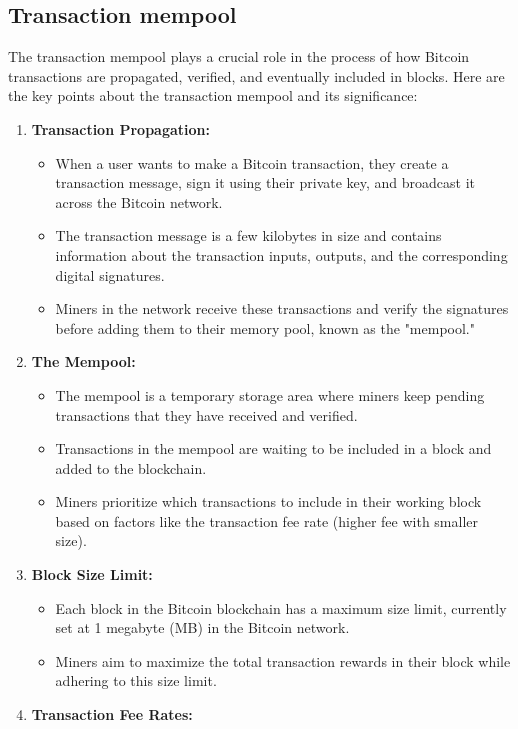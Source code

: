 \subsection{Transaction mempool}
The transaction mempool plays a crucial role in the process of how Bitcoin transactions are propagated, verified, and eventually included in blocks. Here are the key points about the transaction mempool and its significance:
\begin{enumerate}
	\item \textbf{Transaction Propagation:}
	\begin{itemize}
		\item When a user wants to make a Bitcoin transaction, they create a transaction message, sign it using their private key, and broadcast it across the Bitcoin network.
		\item The transaction message is a few kilobytes in size and contains information about the transaction inputs, outputs, and the corresponding digital signatures.
		\item Miners in the network receive these transactions and verify the signatures before adding them to their memory pool, known as the "mempool."
	\end{itemize}
	\item \textbf{The Mempool:}
	\begin{itemize}
		\item The mempool is a temporary storage area where miners keep pending transactions that they have received and verified.
		\item Transactions in the mempool are waiting to be included in a block and added to the blockchain.
		\item Miners prioritize which transactions to include in their working block based on factors like the transaction fee rate (higher fee with smaller size).
	\end{itemize}
	\item \textbf{Block Size Limit:}
	\begin{itemize}
		\item Each block in the Bitcoin blockchain has a maximum size limit, currently set at 1 megabyte (MB) in the Bitcoin network.
		\item Miners aim to maximize the total transaction rewards in their block while adhering to this size limit.
	\end{itemize}
	\item \textbf{Transaction Fee Rates:}
	\begin{itemize}

\end{itemize}
\end{enumerate}
